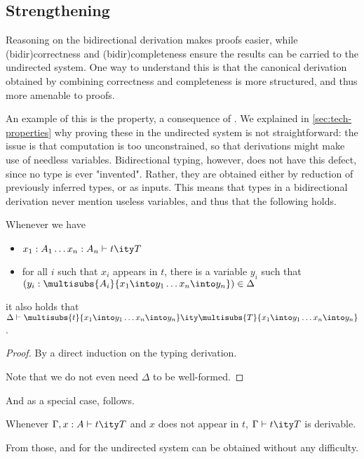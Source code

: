 \subsection{Strengthening}

Reasoning on the bidirectional derivation makes proofs easier,
while \kl(bidir){correctness} and \kl(bidir){completeness} ensure the results
can be carried to the undirected system.
One way to understand this is that the canonical derivation obtained by combining
correctness and completeness is more structured, and thus more amenable to proofs.

An example of this is the  property, a consequence of
. We explained in \cref{sec:tech-properties}
why proving these in the undirected system is not straightforward: the issue is that 
computation is too unconstrained, so that derivations might make use of needless variables.
Bidirectional typing, however, does not have this defect, since no type is ever "invented".
Rather, they are obtained either by reduction of previously inferred types, or as inputs.
This means that types in a bidirectional derivation never mention useless variables, and thus
that the following holds.

\begin{minipage}{\textwidth}
\begin{theorem}
  \label{thm:strong-stab-renaming-bidir}
  Whenever we have 
  \begin{itemize}
    \item $\inferty{x_1 : A_1 \dots x_n : A_n}{t}{T}$
    \item for all $i$ such that $x_i$ appears in $t$,
      there is a variable $y_i$ such that $(y_i : \multisubs{A_i}{x_1 \into y_1 \dots x_n \into y_n}) \in \Delta$
  \end{itemize} 
  it also holds that $\inferty{\Delta}{\multisubs{t}{x_1 \into y_1 \dots x_n \into y_n}}{\multisubs{T}{x_1 \into y_1 \dots x_n \into y_n}}$.
\end{theorem}
\end{minipage}

\begin{proof}
  By a direct induction on the typing derivation.

  Note that we do not even need $\Delta$ to be well-formed.
\end{proof}

And as a special case,  follows.

\begin{theorem}
  \label{thm:strengthening-bidir}
  Whenever $\inferty{\Gamma, x : A}{t}{T}$ and $x$ does not appear in $t$,
  $\inferty{\Gamma}{t}{T}$ is derivable.
\end{theorem}

From those,  and  for
the undirected system can be obtained without any difficulty.